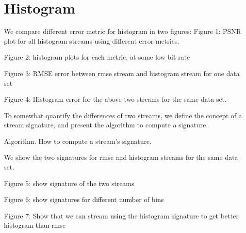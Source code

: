 
\section{Histogram}
We compare different error metric for histogram in two figures:
Figure 1: PSNR plot for all histogram streams using different error metrics.

Figure 2: histogram plots for each metric, at some low bit rate

Figure 3: RMSE error between rmse stream and histogram stream for one data set

Figure 4: Histogram error for the  above two streams for the same data set.

To somewhat quantify the differences of two streams, we define the concept of a stream signature, and present the algorithm to compute a signature.

Algorithm. How to compute a stream's signature.

We show the two signatures for rmse and histogram streams for the same data set.

Figure 5: show signature of the two streams

Figure 6: show signatures for different number of bins

Figure 7: Show that we can stream using the histogram signature to get better histogram than rmse